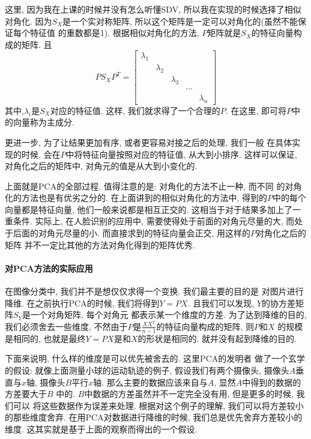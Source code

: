 \documentclass[fleqn,10pt]{SelfArx} %
\begin{document}
		这里, 因为我在上课的时候并没有怎么听懂SDV, 所以我在实现的时候选择了相似对角化.
		因为$S_X$是一个实对称矩阵, 所以这个矩阵是一定可以对角化的(虽然不能保证每个特征值
		的重数都是1). 根据相似对角化的方法, $P$矩阵就是$S_X$的特征向量构成的矩阵. 且
		\begin{equation}
			PS_XP^T = \left[
				\begin{array}{ccccc}
					\lambda_1 & & & & \\
					          & \lambda_2 & & & \\
							  & & \lambda_3 & & \\
							  & & & \cdots & \\
							  & & & & \lambda_n
				\end{array}
			\right]
		\end{equation}
		其中,$\lambda_i$是$S_X$对应的特征值. 这样, 我们就求得了一个合理的$P$.
		在这里, 即可将$P$中的向量称为主成分.

		更进一步, 为了让结果更加有序, 或者更容易对接之后的处理, 我们一般
		在具体实现的时候, 会在$P$中将特征向量按照对应的特征值, 从大到小排序.
		这样可以保证, 对角化之后的矩阵中, 对角元的值是从大到小变化的.

		上面就是PCA的全部过程. 值得注意的是: 对角化的方法不止一种, 而不同
		的对角化的方法也是有优劣之分的. 在上面讲到的相似对角化的方法中,
		得到的$P$中的每个向量都是特征向量, 他们一般来说都是相互正交的.
		这相当于对于结果多加上了一重条件. 实际上, 在人脸识别的应用中,
		需要使得处于前面的对角元尽量的大, 而处于后面的对角元尽量的小.
		而直接求到的特征向量会正交, 用这样的$P$对角化之后的矩阵
		并不一定比其他的方法对角化得到的矩阵优秀.

	\paragraph{对PCA方法的实际应用}
		在图像分类中, 我们并不是想仅仅求得一个变换. 我们最主要的目的是
		对图片进行降维. 在之前执行PCA的时候, 我们将得到$Y = PX$.
		且我们可以发现, $Y$的协方差矩阵$S_Y$是一个对角矩阵, 每个对角元
		都表示某一个维度的方差. 为了达到降维的目的, 我们必须舍去一些维度,
		不然由于$P$是$\frac{XX^T}{n-1}$的特征向量构成的矩阵, 则$P$和$X$
		的规模是相同的, 也就是最终$Y = PX$是和$X$的形状是相同的.
		就并没有起到降维的目的.
		
		下面来说明, 什么样的维度是可以优先被舍去的. 这里PCA的发明者
		做了一个玄学的假设: 就像上面测量小球的运动轨迹的例子, 
		假设我们有两个摄像头, 摄像头$A$垂直与$x$轴, 摄像头$B$平行$x$轴.
		那么主要的数据应该来自与$A$, 显然$A$中得到的数据的方差要大于$B$
		中的. $B$中数据的方差虽然并不一定完全没有用, 但是更多的时候, 我们可以
		将这些数据作为误差来处理.
		根据对这个例子的理解, 我们可以将方差较小的那些维度舍弃. 
		在用PCA对数据进行降维的时候, 我们总是优先舍弃方差较小的维度.
		这其实就是基于上面的观察而得出的一个假设.
\end{document}
